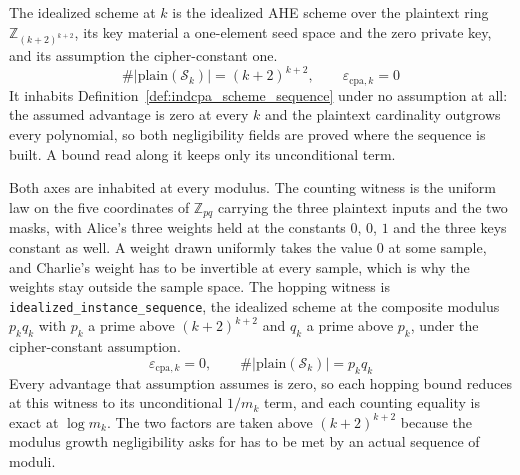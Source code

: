 \begin{definition}
  \label{def:idealized_scheme_sequence}
  \rocqok
  The idealized scheme at $k$ is the idealized AHE scheme over the plaintext
  ring $\mathbb{Z}_{(k+2)^{k+2}}$, its key material a one-element seed space
  and the zero private key, and its assumption the cipher-constant one.
  \[ \#\lvert\mathrm{plain}(\mathcal{S}_k)\rvert = (k+2)^{k+2}, \qquad
     \varepsilon_{\mathrm{cpa},k} = 0 \]
  It inhabits Definition~\ref{def:indcpa_scheme_sequence} under no assumption
  at all: the assumed advantage is zero at every $k$ and the plaintext
  cardinality outgrows every polynomial, so both negligibility fields are
  proved where the sequence is built. A bound read along it keeps only its
  unconditional term.
\end{definition}

\begin{definition}
  \label{def:idealized_setting}
  \rocqok
  Both axes are inhabited at every modulus. The counting witness is the
  uniform law on the five coordinates of $\mathbb{Z}_{pq}$ carrying the three
  plaintext inputs and the two masks, with Alice's three weights held at the
  constants $0$, $0$, $1$ and the three keys constant as well. A weight drawn
  uniformly takes the value $0$ at some sample, and Charlie's weight has to be
  invertible at every sample, which is why the weights stay outside the sample
  space. The hopping witness is \texttt{idealized\_instance\_sequence}, the
  idealized scheme at the composite modulus $p_k q_k$ with $p_k$ a prime above
  $(k+2)^{k+2}$ and $q_k$ a prime above $p_k$, under the cipher-constant
  assumption.
  \[ \varepsilon_{\mathrm{cpa},k} = 0, \qquad
     \#\lvert\mathrm{plain}(\mathcal{S}_k)\rvert = p_k q_k \]
  Every advantage that assumption assumes is zero, so each hopping bound
  reduces at this witness to its unconditional $1/m_k$ term, and each counting
  equality is exact at $\log m_k$. The two factors are taken above
  $(k+2)^{k+2}$ because the modulus growth negligibility asks for has to be
  met by an actual sequence of moduli.
\end{definition}

